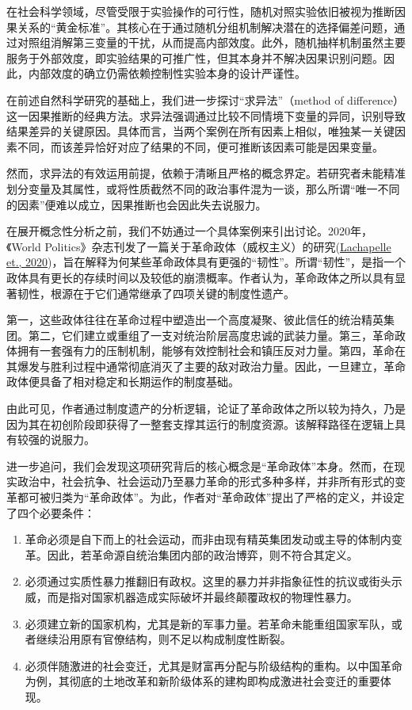 在社会科学领域，尽管受限于实验操作的可行性，随机对照实验依旧被视为推断因果关系的“黄金标准”。其核心在于通过随机分组机制解决潜在的选择偏差问题，通过对照组消解第三变量的干扰，从而提高内部效度。此外，随机抽样机制虽然主要服务于外部效度，即实验结果的可推广性，但其本身并不解决因果识别问题。因此，内部效度的确立仍需依赖控制性实验本身的设计严谨性。

在前述自然科学研究的基础上，我们进一步探讨“求异法”（method of difference）这一因果推断的经典方法。求异法强调通过比较不同情境下变量的异同，识别导致结果差异的关键原因。具体而言，当两个案例在所有因素上相似，唯独某一关键因素不同，而该差异恰好对应了结果的不同，便可推断该因素可能是因果变量。

然而，求异法的有效运用前提，依赖于清晰且严格的概念界定。若研究者未能精准划分变量及其属性，或将性质截然不同的政治事件混为一谈，那么所谓“唯一不同的因素”便难以成立，因果推断也会因此失去说服力。

在展开概念性分析之前，我们不妨通过一个具体案例来引出讨论。2020年，《World Politics》杂志刊发了一篇关于革命政体（威权主义）的研究(\href{https://doi.org/10.1017/S0043887120000106}{Lachapelle et., 2020})，旨在解释为何某些革命政体具有更强的“韧性”。所谓“韧性”，是指一个政体具有更长的存续时间以及较低的崩溃概率。作者认为，革命政体之所以具有显著韧性，根源在于它们通常继承了四项关键的制度性遗产。

第一，这些政体往往在革命过程中塑造出一个高度凝聚、彼此信任的统治精英集团。第二，它们建立或重组了一支对统治阶层高度忠诚的武装力量。第三，革命政体拥有一套强有力的压制机制，能够有效控制社会和镇压反对力量。第四，革命在其爆发与胜利过程中通常彻底消灭了主要的敌对政治力量。因此，一旦建立，革命政体便具备了相对稳定和长期运作的制度基础。

由此可见，作者通过制度遗产的分析逻辑，论证了革命政体之所以较为持久，乃是因为其在初创阶段即获得了一整套支撑其运行的制度资源。该解释路径在逻辑上具有较强的说服力。

进一步追问，我们会发现这项研究背后的核心概念是“革命政体”本身。然而，在现实政治中，社会抗争、社会运动乃至暴力革命的形式多种多样，并非所有形式的变革都可被归类为“革命政体”。为此，作者对“革命政体”提出了严格的定义，并设定了四个必要条件：

\begin{enumerate}
	\item 革命必须是自下而上的社会运动，而非由现有精英集团发动或主导的体制内变革。因此，若革命源自统治集团内部的政治博弈，则不符合其定义。
	\item 必须通过实质性暴力推翻旧有政权。这里的暴力并非指象征性的抗议或街头示威，而是指对国家机器造成实际破坏并最终颠覆政权的物理性暴力。
	\item 必须建立新的国家机构，尤其是新的军事力量。若革命未能重组国家军队，或者继续沿用原有官僚结构，则不足以构成制度性断裂。
	\item 必须伴随激进的社会变迁，尤其是财富再分配与阶级结构的重构。以中国革命为例，其彻底的土地改革和新阶级体系的建构即构成激进社会变迁的重要体现。
\end{enumerate}


